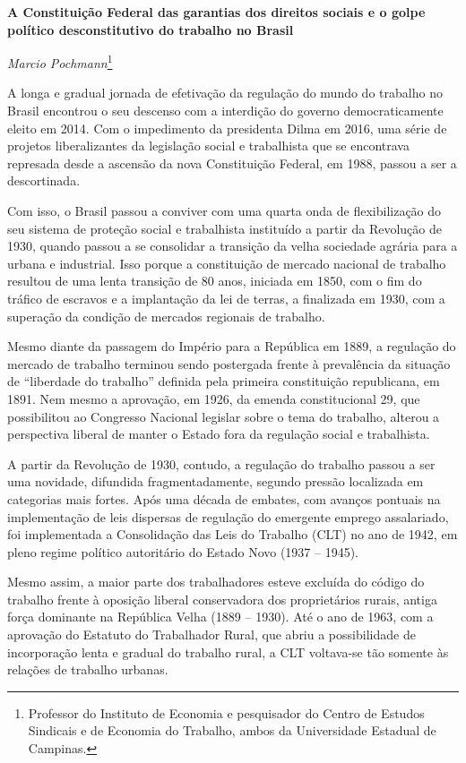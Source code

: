 \textbf{A Constituição Federal das garantias dos direitos sociais e o
golpe político desconstitutivo do trabalho no Brasil }

\emph{Marcio Pochmann}\footnote{Professor do Instituto de Economia e
  pesquisador do Centro de Estudos Sindicais e de Economia do Trabalho,
  ambos da Universidade Estadual de Campinas.}

A longa e gradual jornada de efetivação da regulação do mundo do
trabalho no Brasil encontrou o seu descenso com a interdição do governo
democraticamente eleito em 2014. Com o impedimento da presidenta Dilma
em 2016, uma série de projetos liberalizantes da legislação social e
trabalhista que se encontrava represada desde a ascensão da nova
Constituição Federal, em 1988, passou a ser a descortinada.

Com isso, o Brasil passou a conviver com uma quarta onda de
flexibilização do seu sistema de proteção social e trabalhista
instituído a partir da Revolução de 1930, quando passou a se consolidar
a transição da velha sociedade agrária para a urbana e industrial. Isso
porque a constituição de mercado nacional de trabalho resultou de uma
lenta transição de 80 anos, iniciada em 1850, com o fim do tráfico de
escravos e a implantação da lei de terras, a finalizada em 1930, com a
superação da condição de mercados regionais de trabalho.

Mesmo diante da passagem do Império para a República em 1889, a
regulação do mercado de trabalho terminou sendo postergada frente à
prevalência da situação de ``liberdade do trabalho'' definida pela
primeira constituição republicana, em 1891. Nem mesmo a aprovação, em
1926, da emenda constitucional 29, que possibilitou ao Congresso
Nacional legislar sobre o tema do trabalho, alterou a perspectiva
liberal de manter o Estado fora da regulação social e trabalhista.

A partir da Revolução de 1930, contudo, a regulação do trabalho passou a
ser uma novidade, difundida fragmentadamente, segundo pressão localizada
em categorias mais fortes. Após uma década de embates, com avanços
pontuais na implementação de leis dispersas de regulação do emergente
emprego assalariado, foi implementada a Consolidação das Leis do
Trabalho (CLT) no ano de 1942, em pleno regime político autoritário do
Estado Novo (1937 -- 1945).

Mesmo assim, a maior parte dos trabalhadores esteve excluída do código
do trabalho frente à oposição liberal conservadora dos proprietários
rurais, antiga força dominante na República Velha (1889 -- 1930). Até o
ano de 1963, com a aprovação do Estatuto do Trabalhador Rural, que abriu
a possibilidade de incorporação lenta e gradual do trabalho rural, a CLT
voltava-se tão somente às relações de trabalho urbanas.

